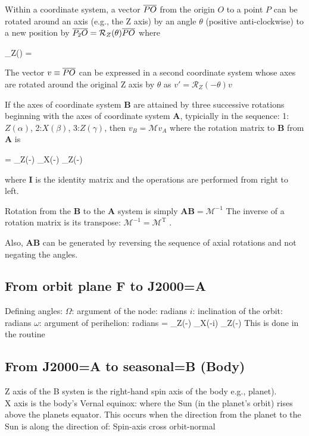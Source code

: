 \documentclass[draft]{article}
\begin{document}
Within a coordinate system, a vector $ \overline{PO}$ from the origin $O$ to a point
$P$ can be rotated around an axis (e.g., the Z axis) by an angle $\theta$
(positive anti-clockwise) to a new position by $ \overline{P_2O}=
\mathcal{R}_Z(\theta) \overline{PO} $ where

\qbn  {}_Z(\theta) =  \qen 

The vector $v \equiv \overline{PO}$ can be expressed in a second coordinate system
whose axes are rotated around the original Z axis by $\theta$ as $v'=
\mathcal{R}_Z(-\theta) v$

If the axes of coordinate system \textbf{B} are attained by three successive
rotations beginning with the axes of coordinate system \textbf{A}, typicially in
the sequence: 1:$Z(\alpha)$, 2:$X(\beta)$, 3:$Z(\gamma)$, then $v_B=\mathcal{M}
v_A$ where the rotation matrix to \textbf{B} from \textbf{A} is

\qbn {} \equiv {}=   _Z(-\gamma) \ast {}_X(-\beta)  \ast {}_Z(-\alpha)  \ast {} \qen 

where \textbf{I} is the identity matrix and the operations are performed from right to left.

Rotation from the \textbf{B} to the \textbf{A} system is simply 
\textbf{AB}$=\mathcal{M}^{-1} $ 
\qi The inverse of a rotation matrix is its transpose:
    $\mathcal{M}^{-1}= \mathcal{M}^{\mathrm{T}}$ . 

Also, \textbf{AB} can be generated by reversing the sequence of axial rotations
and not negating the angles.

\subsection{From orbit plane F  to J2000=A}
Defining angles:
\qi $\Omega$: argument of the node:  radians
\qi $i$: inclination of the orbit:  radians
\qi $\omega$: argument of perihelion:  radians
\qbn {} =   _Z(-\Omega) \ast 
{}_X(-i)  \ast {}_Z(-\omega)  \ast {} \qen 
This is done in the routine 

\subsection{From J2000=A to seasonal=B (Body)}
Z axis of the B systen is the right-hand spin axis of the body e.g., planet).
\\ X axis is the body's Vernal equinox: where the Sun (in the planet's orbit) rises above the planets equator. This occurs when the direction from the planet to the Sun is along the direction of: Spin-axis cross orbit-normal  
\end{document}
